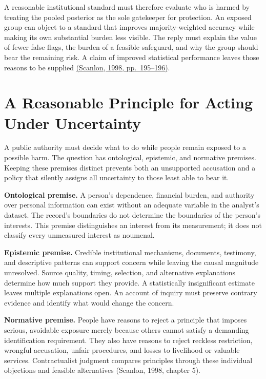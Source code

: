 A reasonable institutional standard must therefore evaluate who is
harmed by treating the pooled posterior as the sole gatekeeper for
protection. An exposed group can object to a standard that improves
majority-weighted accuracy while making its own substantial burden less
visible. The reply must explain the value of fewer false flags, the
burden of a feasible safeguard, and why the group should bear the
remaining risk. A claim of improved statistical performance leaves those
reasons to be supplied
\href{https://e-edu.nbu.bg/pluginfile.php/314831/mod_resource/content/0/scanlon_5.1-3.pdf}{(Scanlon,
1998, pp.~195--196)}.


\hypertarget{M09-a-reasonable-principle-for-acting-under-uncertainty}{%
\section{A Reasonable Principle for Acting Under
Uncertainty}\label{M09-a-reasonable-principle-for-acting-under-uncertainty}}

\noindent A public authority must decide what to do while people remain exposed to
a possible harm. The question has ontological, epistemic, and normative
premises. Keeping these premises distinct prevents both an unsupported
accusation and a policy that silently assigns all uncertainty to those
least able to bear it.

\textbf{Ontological premise.} A person's dependence, financial burden,
and authority over personal information can exist without an adequate
variable in the analyst's dataset. The record's boundaries do not
determine the boundaries of the person's interests. This premise
distinguishes an interest from its measurement; it does not classify
every unmeasured interest as noumenal.

\textbf{Epistemic premise.} Credible institutional mechanisms,
documents, testimony, and descriptive patterns can support concern while
leaving the causal magnitude unresolved. Source quality, timing,
selection, and alternative explanations determine how much support they
provide. A statistically insignificant estimate leaves multiple
explanations open. An account of inquiry must preserve contrary evidence
and identify what would change the concern.

\textbf{Normative premise.} People have reasons to reject a principle
that imposes serious, avoidable exposure merely because others cannot
satisfy a demanding identification requirement. They also have reasons
to reject reckless restriction, wrongful accusation, unfair procedures,
and losses to livelihood or valuable services. Contractualist judgment
compares principles through these individual objections and feasible
alternatives (Scanlon, 1998, chapter 5).

